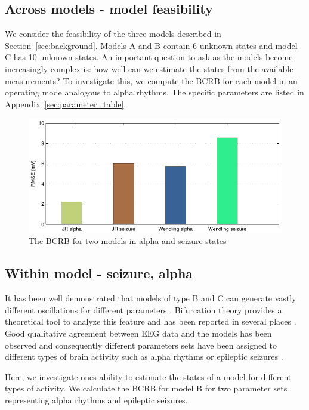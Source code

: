 \documentclass{article}
\begin{document}
\subsection{Across models - model feasibility}

We consider the feasibility of the three models described in Section~\ref{sec:background}. Models A and B contain 6 unknown states and model C has 10 unknown states. An important question to ask as the models become increasingly complex is: how well can we estimate the states from the available measurements? To investigate this, we compute the BCRB for each model in an operating mode analogous to alpha rhythms. The specific parameters are listed in Appendix~\ref{sec:parameter_table}.

\begin{figure}[ht]
  \begin{center}
    \includegraphics{./figures/pdf/AlphaSeizureBar}
  \end{center}
  \caption{The BCRB for two models in alpha and seizure states}
  \label{fig:AlphaSeizure}
\end{figure}



\subsection{Within model - seizure, alpha}

It has been well demonstrated that models of type B and C can generate vastly different oscillations for different parameters \cite{sdf}. Bifurcation theory provides a theoretical tool to analyze this feature and has been reported in several places \cite{sdf}. Good qualitative agreement between EEG data and the models has been observed and consequently different parameters sets have been assigned to different types of brain activity such as alpha rhythms or epileptic seizures \cite{sfd}.

Here, we investigate ones ability to estimate the states of a model for different types of activity. We calculate the BCRB for model B for two parameter sets representing alpha rhythms and epileptic seizures.
\end{document}
